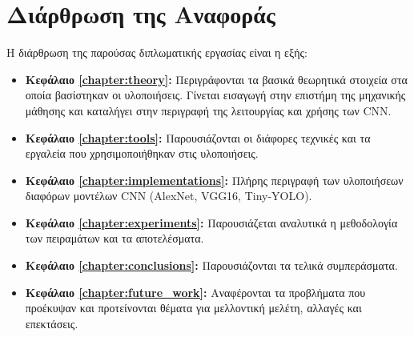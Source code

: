 \section{Διάρθρωση της Αναφοράς}
\label{section:layout}

Η διάρθρωση της παρούσας διπλωματικής εργασίας είναι η εξής:

\begin{itemize}
  \item{\textbf{Κεφάλαιο \ref{chapter:theory}:} Περιγράφονται τα βασικά θεωρητικά στοιχεία
      στα οποία βασίστηκαν οι υλοποιήσεις. Γίνεται εισαγωγή στην επιστήμη
      της μηχανικής μάθησης και καταλήγει στην περιγραφή της λειτουργίας
      και χρήσης των CNN.
    }
  \item{\textbf{Κεφάλαιο \ref{chapter:tools}:} Παρουσιάζονται οι
      διάφορες τεχνικές και τα εργαλεία που χρησιμοποιήθηκαν στις
      υλοποιήσεις.
    }
  \item{\textbf{Κεφάλαιο \ref{chapter:implementations}:} Πλήρης περιγραφή των υλοποιήσεων
      διαφόρων μοντέλων CNN (AlexNet, VGG16, Tiny-YOLO).
    }
  \item{\textbf{Κεφάλαιο \ref{chapter:experiments}:} Παρουσιάζεται αναλυτικά η μεθοδολογία των
      πειραμάτων και τα αποτελέσματα.
    }
  \item{\textbf{Κεφάλαιο \ref{chapter:conclusions}:} Παρουσιάζονται τα τελικά συμπεράσματα.
    }
  \item{\textbf{Κεφάλαιο \ref{chapter:future_work}:} Αναφέρονται τα
      προβλήματα που προέκυψαν και προτείνονται θέματα για μελλοντική
      μελέτη, αλλαγές και επεκτάσεις.
    }
\end{itemize}


